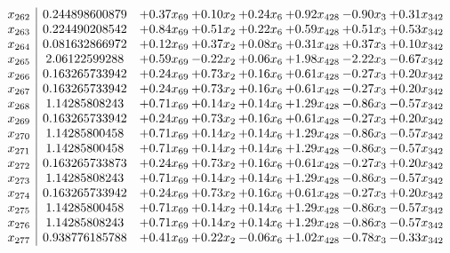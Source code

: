 \documentclass[8pt]{article}
\begin{document}
\[\begin{array}{c| c c@{\hskip 2pt} c@{\hskip 2pt} c@{\hskip 2pt} c@{\hskip 2pt} c@{\hskip 2pt} c@{\hskip 2pt} }
 x_{262}   &  0.244898600879 & +  0.37 x_{69} & +  0.10 x_{2} & +  0.24 x_{6} & +  0.92 x_{428} & -0.90 x_{3} & +  0.31 x_{342}\\
 x_{263}   &  0.224490208542 & +  0.84 x_{69} & +  0.51 x_{2} & +  0.22 x_{6} & +  0.59 x_{428} & +  0.51 x_{3} & +  0.53 x_{342}\\
 x_{264}   &  0.081632866972 & +  0.12 x_{69} & +  0.37 x_{2} & +  0.08 x_{6} & +  0.31 x_{428} & +  0.37 x_{3} & +  0.10 x_{342}\\
 x_{265}   &  2.06122599288 & +  0.59 x_{69} & -0.22 x_{2} & +  0.06 x_{6} & +  1.98 x_{428} & -2.22 x_{3} & -0.67 x_{342}\\
 x_{266}   &  0.163265733942 & +  0.24 x_{69} & +  0.73 x_{2} & +  0.16 x_{6} & +  0.61 x_{428} & -0.27 x_{3} & +  0.20 x_{342}\\
 x_{267}   &  0.163265733942 & +  0.24 x_{69} & +  0.73 x_{2} & +  0.16 x_{6} & +  0.61 x_{428} & -0.27 x_{3} & +  0.20 x_{342}\\
 x_{268}   &  1.14285808243 & +  0.71 x_{69} & +  0.14 x_{2} & +  0.14 x_{6} & +  1.29 x_{428} & -0.86 x_{3} & -0.57 x_{342}\\
 x_{269}   &  0.163265733942 & +  0.24 x_{69} & +  0.73 x_{2} & +  0.16 x_{6} & +  0.61 x_{428} & -0.27 x_{3} & +  0.20 x_{342}\\
 x_{270}   &  1.14285800458 & +  0.71 x_{69} & +  0.14 x_{2} & +  0.14 x_{6} & +  1.29 x_{428} & -0.86 x_{3} & -0.57 x_{342}\\
 x_{271}   &  1.14285800458 & +  0.71 x_{69} & +  0.14 x_{2} & +  0.14 x_{6} & +  1.29 x_{428} & -0.86 x_{3} & -0.57 x_{342}\\
 x_{272}   &  0.163265733873 & +  0.24 x_{69} & +  0.73 x_{2} & +  0.16 x_{6} & +  0.61 x_{428} & -0.27 x_{3} & +  0.20 x_{342}\\
 x_{273}   &  1.14285808243 & +  0.71 x_{69} & +  0.14 x_{2} & +  0.14 x_{6} & +  1.29 x_{428} & -0.86 x_{3} & -0.57 x_{342}\\
 x_{274}   &  0.163265733942 & +  0.24 x_{69} & +  0.73 x_{2} & +  0.16 x_{6} & +  0.61 x_{428} & -0.27 x_{3} & +  0.20 x_{342}\\
 x_{275}   &  1.14285800458 & +  0.71 x_{69} & +  0.14 x_{2} & +  0.14 x_{6} & +  1.29 x_{428} & -0.86 x_{3} & -0.57 x_{342}\\
 x_{276}   &  1.14285808243 & +  0.71 x_{69} & +  0.14 x_{2} & +  0.14 x_{6} & +  1.29 x_{428} & -0.86 x_{3} & -0.57 x_{342}\\
 x_{277}   &  0.938776185788 & +  0.41 x_{69} & +  0.22 x_{2} & -0.06 x_{6} & +  1.02 x_{428} & -0.78 x_{3} & -0.33 x_{342}\\

\end{array}\]
\end{document}
